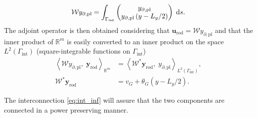 \documentclass[letterpaper, 10 pt, conference]{ieeeconf}
\begin{document}
\begin{equation}
\mathcal{W} y_{\partial, \text{pl}} = \int_{\Gamma_{\text{int}}} \begin{pmatrix}
y_{\partial, \text{pl}} \\
y_{\partial, \text{pl}} \left( y - L_y/2 \right) \\
\end{pmatrix} \d{s}.
\end{equation}
The adjoint operator is then obtained considering that $\bm{u}_{\text{rod}} = \mathcal{W} y_{\partial, \text{pl}}$ and that the inner product of $\mathbb{R}^m$ is easily converted to an inner product on the space $L^2(\Gamma_{\text{int}})$ (square-integrable functions on $\Gamma_{\text{int}}$)
\begin{align*}
\left\langle \mathcal{W} y_{\partial, \text{pl}}, \; \bm{y}_{\text{rod}} \right\rangle_{\mathbb{R}^m} &= \left\langle \mathcal{W}^* \bm{y}_{\text{rod}} , \; y_{\partial, \text{pl}} \right\rangle_{L^2(\Gamma_{\text{int}})}, \\
\mathcal{W}^* \bm{y}_{\text{rod}} &= v_G + \theta_{G} \left( y - L_y/2 \right).
\end{align*}

The interconnection \eqref{eq:int_inf} will assure that the two components are connected in a power preserving manner.
\end{document}
